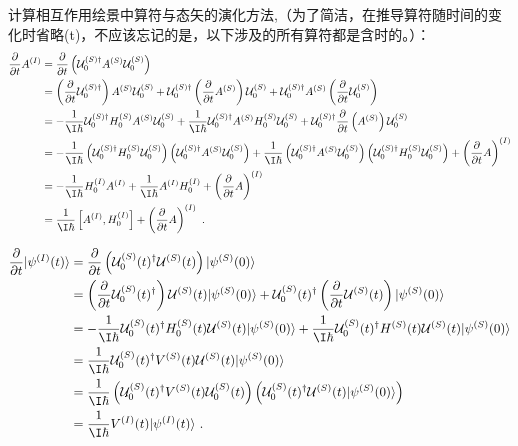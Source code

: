 计算相互作用绘景中算符与态矢的演化方法,（为了简洁，在推导算符随时间的变化时省略(t)，不应该忘记的是，以下涉及的所有算符都是含时的。）：
\begin{equation}
\begin{aligned}
\frac{\partial}{\partial t}A^{(I)}&=\frac{\partial}{\partial t}\left(\mathcal U^{(S)\dagger}_0 A^{(S)}\mathcal U^{(S)}_0 \right)\\
&=\left(\frac{\partial}{\partial t}\mathcal U^{(S)\dagger}_0\right) A^{(S)}\mathcal U^{(S)}_0 +\mathcal U^{(S)\dagger}_0 \left(\frac{\partial}{\partial t}A^{(S)}\right)\mathcal U^{(S)}_0+\mathcal U^{(S)\dagger}_0 A^{(S)}\left(\frac{\partial}{\partial t}\mathcal U^{(S)}_0\right)\\
&=-\frac{1}{\I\hbar}\mathcal U^{(S)\dagger}_0 H^{(S)}_0A^{(S)}\mathcal U^{(S)}_0 +\frac{1}{\I\hbar}\mathcal U^{(S)\dagger}_0 A^{(S)}H^{(S)}_0\mathcal U^{(S)}_0+\mathcal U^{(S)\dagger}_0 \frac{\partial}{\partial t}\left(A^{(S)}\right)\mathcal U^{(S)}_0 \\
&=-\frac{1}{\I\hbar}\left(\mathcal U^{(S)\dagger}_0 H^{(S)}_0 \mathcal U^{(S)}_0\right)\left(\mathcal U^{(S)\dagger}_0 A^{(S)}\mathcal U^{(S)}_0\right) +\frac{1}{\I\hbar}\left(\mathcal U^{(S)\dagger}_0 A^{(S)}\mathcal U^{(S)}_0\right)\left(\mathcal U^{(S)\dagger}_0 H^{(S)}_0\mathcal U^{(S)}_0\right)+\left(\frac{\partial}{\partial t}A\right)^{(I)} \\
&=-\frac{1}{\I\hbar} H^{(I)}_0  A^{(I)}+\frac{1}{\I\hbar} A^{(I)} H^{(I)}_0+\left(\frac{\partial}{\partial t}A\right)^{(I)} \\
&=\frac{1}{\I\hbar}\left[A^{(I)},H_0^{(I)}\right]+\left(\frac{\partial}{\partial t}A\right)^{(I)}~.
\end{aligned}
\end{equation}

\begin{equation}
\begin{aligned}
\frac{\partial}{\partial t}|\psi^{(I)}(t)\rangle&=
\frac{\partial}{\partial t}\left(\mathcal U^{(S)}_0(t)^\dagger\mathcal U^{(S)}(t)\right)|\psi^{(S)}(0)\rangle \\
&=\left(\frac{\partial}{\partial t}\mathcal U^{(S)}_0(t)^\dagger\right)\mathcal U^{(S)}(t)|\psi^{(S)}(0)\rangle+\mathcal U^{(S)}_0(t)^\dagger\left(\frac{\partial}{\partial t}\mathcal U^{(S)}(t)\right)|\psi^{(S)}(0)\rangle \\
&=-\frac{1}{\I\hbar}\mathcal U^{(S)}_0(t)^\dagger H^{(S)}_0(t)\mathcal U^{(S)}(t)|\psi^{(S)}(0)\rangle+\frac{1}{\I\hbar}\mathcal U^{(S)}_0(t)^\dagger H^{(S)}(t)\mathcal U^{(S)}(t) |\psi^{(S)}(0)\rangle \\
&=\frac{1}{\I\hbar}\mathcal U^{(S)}_0(t)^\dagger V^{(S)}(t)\mathcal U^{(S)}(t) |\psi^{(S)}(0)\rangle \\
&=\frac{1}{\I\hbar}\left(\mathcal U^{(S)}_0(t)^\dagger V^{(S)}(t)\mathcal U^{(S)}_0(t)\right)\left(\mathcal U^{(S)}_0(t)^\dagger\mathcal U^{(S)}(t) |\psi^{(S)}(0)\rangle\right) \\
&=\frac{1}{\I\hbar}V^{(I)}(t)|\psi^{(I)}(t)\rangle~.
\end{aligned}
\end{equation}

